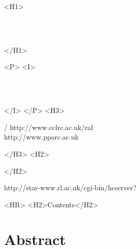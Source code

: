 \begin{htmlonly}
   \xlabel{}
   \begin{rawhtml} <H1> \end{rawhtml}
      \stardoctitle\\
      \stardocversion\\
      \stardocmanual
   \begin{rawhtml} </H1> \end{rawhtml}


   \begin{rawhtml} <P> <I> \end{rawhtml}
   \stardoccategory \stardocnumber \\
   \stardocauthors \\
   \stardocdate
   \begin{rawhtml} </I> </P> <H3> \end{rawhtml}
       /
                        {http://www.cclrc.ac.uk/ral} \\
                        {http://www.pparc.ac.uk} \\
   \begin{rawhtml} </H3> <H2> \end{rawhtml}
   \begin{rawhtml} </H2> \end{rawhtml}
      {http://star-www.rl.ac.uk/cgi-bin/hcserver?\stardocsource}\\

  \label{stardoccontents}
  \begin{rawhtml}
    <HR>
    <H2>Contents</H2>
  \end{rawhtml}
  \newcommand{\latexonlytoc}[0]{}

  \section{Abstract}
\end{htmlonly}

